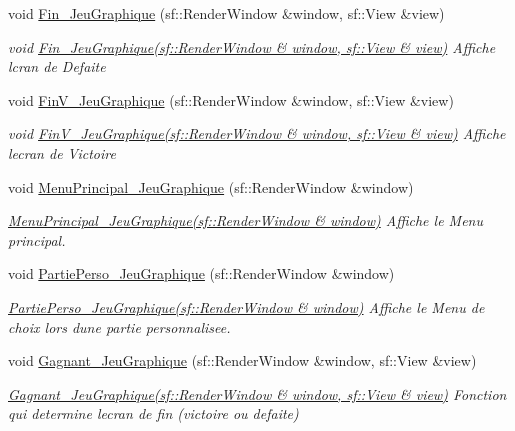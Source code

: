 \begin{DoxyCompactItemize}
void \hyperlink{classJeu__graphique_a7c0810ad56f4394dc8ddb77779d0b625}{Fin\+\_\+\+Jeu\+Graphique} (sf\+::\+Render\+Window \&window, sf\+::\+View \&view)
\begin{DoxyCompactList}\small\item\em void \hyperlink{classJeu__graphique_a7c0810ad56f4394dc8ddb77779d0b625}{Fin\+\_\+\+Jeu\+Graphique(sf\+::\+Render\+Window \& window, sf\+::\+View \& view)} Affiche l\textquotesingle{}cran de Defaite \end{DoxyCompactList}\item 
void \hyperlink{classJeu__graphique_a8e27e53ca84c502138ee4603c1a97a2b}{Fin\+V\+\_\+\+Jeu\+Graphique} (sf\+::\+Render\+Window \&window, sf\+::\+View \&view)
\begin{DoxyCompactList}\small\item\em void \hyperlink{classJeu__graphique_a8e27e53ca84c502138ee4603c1a97a2b}{Fin\+V\+\_\+\+Jeu\+Graphique(sf\+::\+Render\+Window \& window, sf\+::\+View \& view)} Affiche l\textquotesingle{}ecran de Victoire \end{DoxyCompactList}\item 
void \hyperlink{classJeu__graphique_a83b8c542916e2912daec8c8ab8c413ae}{Menu\+Principal\+\_\+\+Jeu\+Graphique} (sf\+::\+Render\+Window \&window)
\begin{DoxyCompactList}\small\item\em \hyperlink{classJeu__graphique_a83b8c542916e2912daec8c8ab8c413ae}{Menu\+Principal\+\_\+\+Jeu\+Graphique(sf\+::\+Render\+Window \& window)} Affiche le Menu principal. \end{DoxyCompactList}\item 
void \hyperlink{classJeu__graphique_a2bc7be0611ffbc0589459ba6203e6efe}{Partie\+Perso\+\_\+\+Jeu\+Graphique} (sf\+::\+Render\+Window \&window)
\begin{DoxyCompactList}\small\item\em \hyperlink{classJeu__graphique_a2bc7be0611ffbc0589459ba6203e6efe}{Partie\+Perso\+\_\+\+Jeu\+Graphique(sf\+::\+Render\+Window \& window)} Affiche le Menu de choix lors d\textquotesingle{}une partie personnalisee. \end{DoxyCompactList}\item 
void \hyperlink{classJeu__graphique_aa26ebcc73b3dbe4c73de32266116e8ff}{Gagnant\+\_\+\+Jeu\+Graphique} (sf\+::\+Render\+Window \&window, sf\+::\+View \&view)
\begin{DoxyCompactList}\small\item\em \hyperlink{classJeu__graphique_aa26ebcc73b3dbe4c73de32266116e8ff}{Gagnant\+\_\+\+Jeu\+Graphique(sf\+::\+Render\+Window \& window, sf\+::\+View \& view)} Fonction qui determine l\textquotesingle{}ecran de fin (victoire ou defaite) \end{DoxyCompactList}\item 

\end{DoxyCompactItemize}
